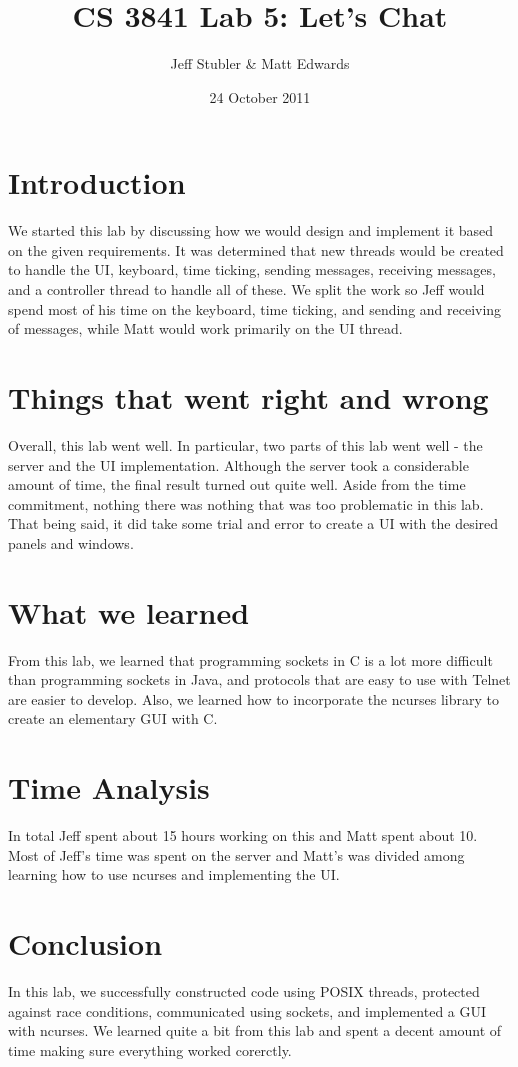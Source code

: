 \documentclass{article}
\begin{document}
\title{CS 3841 Lab 5: Let's Chat}
\author{Jeff Stubler & Matt Edwards}
\date{24 October 2011}
\maketitle

\section*{Introduction}
We started this lab by discussing how we would design and implement it based on the given requirements. It was determined that new threads would be created to handle the UI, keyboard, time ticking, sending messages, receiving messages, and a controller thread to handle all of these. We split the work so Jeff would spend most of his time on the keyboard, time ticking, and sending and receiving of messages, while Matt would work primarily on the UI thread.

\section*{Things that went right and wrong}
Overall, this lab went well. In particular, two parts of this lab went well - the server and the UI implementation. Although the server took a considerable amount of time, the final result turned out quite well. Aside from the time commitment, nothing there was nothing that was too problematic in this lab. That being said, it did take some trial and error to create a UI with the desired panels and windows.

\section*{What we learned}
From this lab, we learned that programming sockets in C is a lot more difficult than programming sockets in Java, and protocols that are easy to use with Telnet are easier to develop. Also, we learned how to incorporate the ncurses library to create an elementary GUI with C.

\section*{Time Analysis}
In total Jeff spent about 15 hours working on this and Matt spent about 10. Most of Jeff's time was spent on the server and Matt's was divided among learning how to use ncurses and implementing the UI.

\section*{Conclusion}
In this lab, we successfully constructed code using POSIX threads, protected against race conditions, communicated using sockets, and implemented a GUI with ncurses. We learned quite a bit from this lab and spent a decent amount of time making sure everything worked corerctly.
\end{document}
